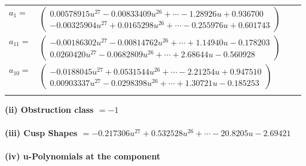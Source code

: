 \documentclass[1p]{elsarticle_modified}
\theoremstyle{definition}
\begin{document}
\begin{tabular}{m{7pt} m{180pt} m{7pt} m{180pt} }
\flushright $a_{1}=$&$\begin{pmatrix}0.00578915 u^{27}-0.00833409 u^{26}+\cdots-1.28926 u+0.936700\\-0.00325904 u^{27}+0.0165298 u^{26}+\cdots-0.255976 u+0.601743\end{pmatrix}$ \\
\flushright $a_{11}=$&$\begin{pmatrix}-0.00186302 u^{27}-0.00814762 u^{26}+\cdots+1.14940 u-0.178203\\0.0260420 u^{27}-0.0682809 u^{26}+\cdots+2.68644 u-0.560928\end{pmatrix}$ \\
\flushright $a_{10}=$&$\begin{pmatrix}-0.0188045 u^{27}+0.0531544 u^{26}+\cdots-2.21254 u+0.947510\\0.00903337 u^{27}-0.0298398 u^{26}+\cdots+1.30721 u-0.185253\end{pmatrix}$\\&\end{tabular}
\flushleft \textbf{(ii) Obstruction class $= -1$}\\~\\
\flushleft \textbf{(iii) Cusp Shapes $= -0.217306 u^{27}+0.532528 u^{26}+\cdots-20.8205 u-2.69421$}\\~\\
\newpage\renewcommand{\arraystretch}{1}
\flushleft \textbf{(iv) u-Polynomials at the component}\newline \\
\end{document}
